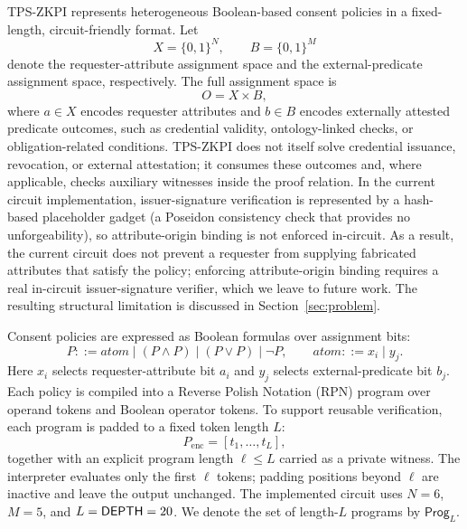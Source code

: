 TPS-ZKPI represents heterogeneous Boolean-based consent policies in a fixed-length, circuit-friendly format.
Let
\begin{equation}
	X = \{0,1\}^{N}, \qquad B = \{0,1\}^{M}
\end{equation}
denote the requester-attribute assignment space and the external-predicate assignment space, respectively.
The full assignment space is
\begin{equation}
	O = X \times B,
\end{equation}
where $a \in X$ encodes requester attributes and $b \in B$ encodes externally attested predicate outcomes, such as credential validity, ontology-linked checks, or obligation-related conditions.
TPS-ZKPI does not itself solve credential issuance, revocation, or external attestation; it consumes these outcomes and, where applicable, checks auxiliary witnesses inside the proof relation.
In the current circuit implementation, issuer-signature verification is represented by a hash-based placeholder gadget (a Poseidon consistency check that provides no unforgeability), so attribute-origin binding is not enforced in-circuit.
As a result, the current circuit does not prevent a requester from supplying fabricated attributes that satisfy the policy; enforcing attribute-origin binding requires a real in-circuit issuer-signature verifier, which we leave to future work. The resulting structural limitation is discussed in Section~\ref{sec:problem}.

Consent policies are expressed as Boolean formulas over assignment bits:
\begin{equation}
	P ::= \mathit{atom} \mid (P \land P) \mid (P \lor P) \mid \neg P,\qquad
	\mathit{atom} ::= x_i \mid y_j .
\end{equation}
Here $x_i$ selects requester-attribute bit $a_i$ and $y_j$ selects external-predicate bit $b_j$.
Each policy is compiled into a Reverse Polish Notation (RPN) program over operand tokens and Boolean operator tokens.
To support reusable verification, each program is padded to a fixed token length $L$:
\begin{equation}
	P_{\mathrm{enc}}= [t_{1},\ldots,t_{L}],
\end{equation}
together with an explicit program length $\ell \le L$ carried as a private witness.
The interpreter evaluates only the first $\ell$ tokens; padding positions beyond $\ell$ are inactive and leave the output unchanged.
The implemented circuit uses $N=6$, $M=5$, and $L=\mathsf{DEPTH}=20$.
We denote the set of length-$L$ programs by $\mathsf{Prog}_{L}$.

